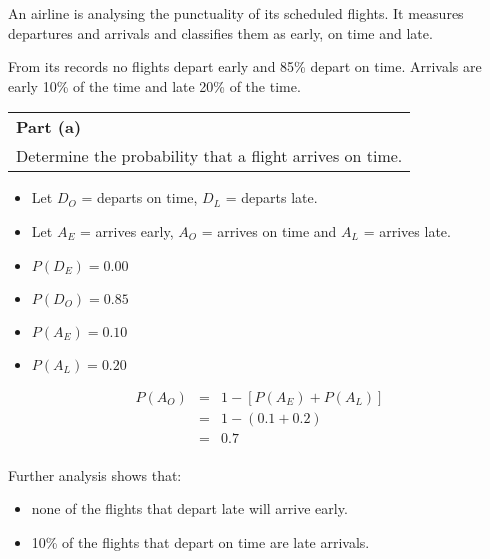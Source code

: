 \documentclass[a4paper,12pt]{article}
\begin{document}
\large
\noindent An airline is analysing the punctuality of its scheduled flights. It measures departures and arrivals and classifies them as early, on time and late.


\noindent From its records no flights depart early and 85\% depart on time. Arrivals are early 10\% of the time and late 20\% of the time.


\bigskip
\begin{table}[ht!]
 \centering
 \begin{tabular}{|p{15cm}|}
 \hline  \large \smallskip
\noindent \textbf{Part (a)}\\  \large
\noindent Determine the probability that a flight arrives on time.
\smallskip
 \\  \hline
  \end{tabular}
\end{table}


\begin{itemize}
    \item Let $D_{O}$ = departs on time, $D_L$ = departs late.
\item Let $A_E$ = arrives early, $A_{O}$ = arrives on time and $A_L$ = arrives late.
\end{itemize}

\begin{framed}
\begin{multicols}{2}
\begin{itemize}
\item $P(D_E) = 0.00$
\item $P(D_O) = 0.85$
\item $P(A_E) = 0.10$
\item $P(A_L) = 0.20$
\end{itemize}
\end{multicols}
\end{framed}

\begin{eqnarray*}
P (A_{O}) &=& 1- [ P (A_{E}) + P (A_{L}) ] \\
&=& 1- (0.1 + 0.2) \\
&=& 0.7 \\
\end{eqnarray*}


\newpage

Further analysis shows that:
\begin{itemize}
\item none of the flights that depart late will arrive early.
\item 10\% of the flights that depart on time are late arrivals.
\end{itemize}
\end{document}
